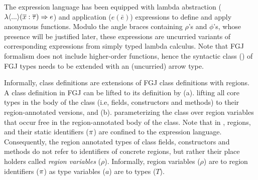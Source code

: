 The expression language has been equipped with lambda abstraction
($\lambda\langle ... \rangle(\overline{x} : \overline{\tau}) \Rightarrow e$) and application ($e(\bar{e})$)
expressions to define and apply anonymous functions.  Modulo the angle
braces containing $\rho$'s and $\phi$'s, whose presence will be
justified later, these expressions are uncurried variants of
corresponding expressions from simply typed lambda calculus. Note that
FGJ formalism does not include higher-order functions, hence the
syntactic class () of FGJ types needs to be extended with an
(uncurried) arrow type.

Informally, \FB class definitions are extensions of FGJ class
definitions with regions. A class definition in FGJ can be lifted to
its \FB definition by (a). lifting all core types in the body of the
class (i.e, fields, constructors and methods) to their
region-annotated versions, and (b). parameterizing the class over
region variables that occur free in the region-annotated body of the
class. Note that in \FB, regions, and their static identifiers
($\pi$) are confined to the expression language. Consequently, the
region annotated types of class fields, constructors and methods do
not refer to identifiers of concrete regions, but rather their place
holders called \emph{region variables} ($\rho$). Informally, region
variables ($\rho$) are to region identifiers ($\pi$) as type
variables ($a$) are to types ($T$). 

